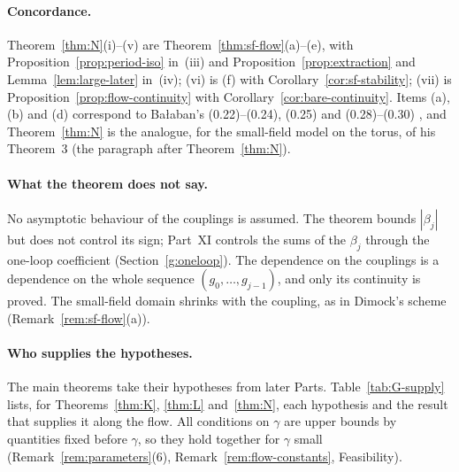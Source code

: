 \paragraph{Concordance.} Theorem~\ref{thm:N}(i)--(v) are Theorem~\ref{thm:sf-flow}(a)--(e), with Proposition~\ref{prop:period-iso} in~(iii) and Proposition~\ref{prop:extraction} and Lemma~\ref{lem:large-later} in~(iv); (vi) is (f) with Corollary~\ref{cor:sf-stability}; (vii) is Proposition~\ref{prop:flow-continuity} with Corollary~\ref{cor:bare-continuity}. Items (a), (b) and (d) correspond to Ba\l aban's (0.22)--(0.24), (0.25) and (0.28)--(0.30) \cite{BalYM4I}, and Theorem~\ref{thm:N} is the analogue, for the small-field model on the torus, of his Theorem~3 (the paragraph after Theorem~\ref{thm:N}).

\paragraph{What the theorem does not say.} No asymptotic behaviour of the couplings is assumed. The theorem bounds $|\beta_j|$ but does not control its sign; Part~XI controls the sums of the $\beta_j$ through the one-loop coefficient (Section~\ref{g:oneloop}). The dependence on the couplings is a dependence on the whole sequence $(g_0,\dots,g_{j-1})$, and only its continuity is proved. The small-field domain shrinks with the coupling, as in Dimock's scheme (Remark~\ref{rem:sf-flow}(a)).

\paragraph{Who supplies the hypotheses.} The main theorems take their hypotheses from later Parts. Table~\ref{tab:G-supply} lists, for Theorems~\ref{thm:K}, \ref{thm:L} and~\ref{thm:N}, each hypothesis and the result that supplies it along the flow. All conditions on $\gamma$ are upper bounds by quantities fixed before $\gamma$, so they hold together for $\gamma$ small (Remark~\ref{rem:parameters}(6), Remark~\ref{rem:flow-constants}, Feasibility).

